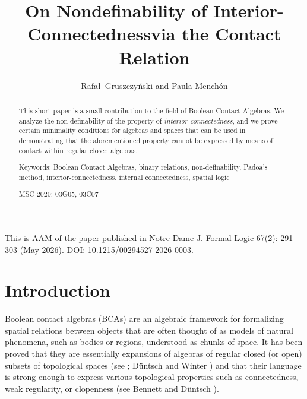 \documentclass[a4paper,12pt]{amsart}
\title[On Nondefinability of Interior-Connectedness]{On Nondefinability of Interior-Connectedness\break via the Contact Relation}
\author[]{Rafa\l\ Gruszczy\'nski and Paula Mench\'{o}n}
\date{}
\numberwithin{equation}{section}
\theoremstyle{mytheoremstyle}
\begin{document}

\noindent \footnotesize{This is AAM of the paper published in Notre Dame J. Formal Logic 67(2): 291--303 (May 2026). DOI: 10.1215/00294527-2026-0003.}
\vspace{1cm}

\begin{abstract}
\begin{sloppypar}
This short paper is a small contribution to the field of Boolean Contact Algebras. We analyze the non-definability of the property of \emph{interior-connectedness}, and we prove certain minimality conditions for algebras and spaces that can be used in demonstrating that the aforementioned property cannot be expressed by means of contact within regular closed algebras.

\smallskip



\noindent Keywords: Boolean Contact Algebras, binary relations, non-definability, Padoa's method, interior-connectedness, internal connectedness, spatial logic
\end{sloppypar}

\smallskip

\noindent MSC 2020: 03G05, 03C07

\end{abstract}

\maketitle

\section{Introduction}
\label{sec1}

Boolean contact algebras (BCAs) are an algebraic framework for formalizing
spatial relations between objects that are often thought of as models of
natural phenomena, such as bodies or regions, understood as chunks of space.
It has been proved that they are essentially expansions of algebras of
regular closed (or open) subsets of topological spaces
(see \cite{Dimov-et-al-CARBTSPA1}; D\"{u}ntsch and Winter \cite{Duntsch-et-al-RTBCA}) and that their language
is strong enough to express various topological properties such as connectedness,
weak regularity, or clopenness (see Bennett and D\"{u}ntsch \cite{Bennett-Duntsch-AAT}).
\end{document}
